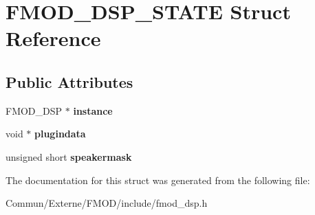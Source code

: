 \hypertarget{struct_f_m_o_d___d_s_p___s_t_a_t_e}{}\section{F\+M\+O\+D\+\_\+\+D\+S\+P\+\_\+\+S\+T\+A\+TE Struct Reference}
\label{struct_f_m_o_d___d_s_p___s_t_a_t_e}
\subsection*{Public Attributes}
\begin{DoxyCompactItemize}
\item 
F\+M\+O\+D\+\_\+\+D\+SP $\ast$ {\bfseries instance}\hypertarget{struct_f_m_o_d___d_s_p___s_t_a_t_e_a1756ea7b18fdd566e64c64de4151a39c}{}\label{struct_f_m_o_d___d_s_p___s_t_a_t_e_a1756ea7b18fdd566e64c64de4151a39c}

\item 
void $\ast$ {\bfseries plugindata}\hypertarget{struct_f_m_o_d___d_s_p___s_t_a_t_e_a94293193f1fd65ffc7d72de31e03932c}{}\label{struct_f_m_o_d___d_s_p___s_t_a_t_e_a94293193f1fd65ffc7d72de31e03932c}

\item 
unsigned short {\bfseries speakermask}\hypertarget{struct_f_m_o_d___d_s_p___s_t_a_t_e_a98c7cf116176d358e3d26193245f6e19}{}\label{struct_f_m_o_d___d_s_p___s_t_a_t_e_a98c7cf116176d358e3d26193245f6e19}

\end{DoxyCompactItemize}


The documentation for this struct was generated from the following file\+:\begin{DoxyCompactItemize}
\item 
Commun/\+Externe/\+F\+M\+O\+D/include/fmod\+\_\+dsp.\+h\end{DoxyCompactItemize}
